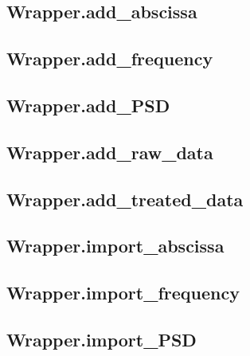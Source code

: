 \subsection{Wrapper.add\_abscissa}\label{subchapter:wrapper.add_abscissa}


\subsection{Wrapper.add\_frequency}\label{subchapter:wrapper.add_frequency}


\subsection{Wrapper.add\_PSD}\label{subchapter:wrapper.add_psd}


\subsection{Wrapper.add\_raw\_data}\label{subchapter:wrapper.add_raw_data}


\subsection{Wrapper.add\_treated\_data}\label{subchapter:wrapper.add_treated_data}


\subsection{Wrapper.import\_abscissa}\label{subchapter:wrapper.import_abscissa}


\subsection{Wrapper.import\_frequency}\label{subchapter:wrapper.import_frequency}


\subsection{Wrapper.import\_PSD}\label{subchapter:wrapper.import_psd}



